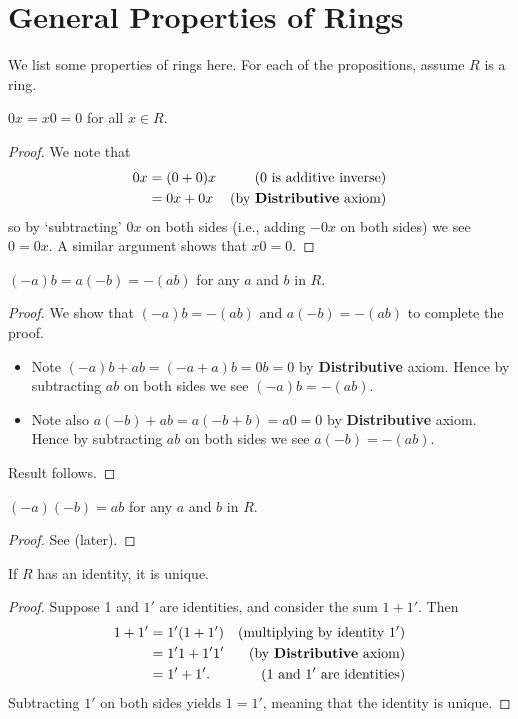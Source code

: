 \section{General Properties of Rings}
We list some properties of rings here. For each of the propositions, assume $R$ is a ring.

\begin{proposition}\label{prop-multiplying-by-zero-is-zero}
    $0x = x0 = 0$ for all $x \in R$.
\end{proposition}
\begin{proof}
    We note that
    \begin{align*}
        0x &= (0 + 0)x & (0 \text{ is additive inverse})\\
        &= 0x + 0x & (\text{by \textbf{Distributive} axiom})
    \end{align*}
    so by `subtracting' $0x$ on both sides (i.e., adding $-0x$ on both sides) we see $0 = 0x$. A similar argument shows that $x0 = 0$.
\end{proof}

\begin{proposition}\label{prop-product-of-element-and-additive-inverse-is-additive-inverse-of-product}
    $(-a)b = a(-b) = -(ab)$ for any $a$ and $b$ in $R$.
\end{proposition}
\begin{proof}
    We show that $(-a)b = -(ab)$ and $a(-b) = -(ab)$ to complete the proof.
    \begin{itemize}
        \item Note $(-a)b + ab = (-a + a)b = 0b = 0$ by \textbf{Distributive} axiom. Hence by subtracting $ab$ on both sides we see $(-a)b = -(ab)$.
        \item Note also $a(-b) + ab = a(-b + b) = a0 = 0$ by \textbf{Distributive} axiom. Hence by subtracting $ab$ on both sides we see $a(-b) = -(ab)$.
    \end{itemize}
    Result follows.
\end{proof}

\begin{proposition}
    $(-a)(-b) = ab$ for any $a$ and $b$ in $R$.
\end{proposition}
\begin{proof}
    See  (later).
\end{proof}

\begin{proposition}
    If $R$ has an identity, it is unique.
\end{proposition}
\begin{proof}
    Suppose 1 and $1'$ are identities, and consider the sum $1 + 1'$. Then
    \begin{align*}
        1 + 1' &= 1'(1+1') & (\text{multiplying by identity }1')\\
        &= 1'1 + 1'1' & (\text{by \textbf{Distributive} axiom})\\
        &= 1' + 1'. & (1 \text{ and } 1' \text{ are identities})
    \end{align*}
    Subtracting $1'$ on both sides yields $1 = 1'$, meaning that the identity is unique.
\end{proof}


